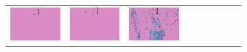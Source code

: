 \documentclass{ipol}
\begin{document}
\begin{figure}[ht]
\begin{subfigure}[t]{\linewidth}
\begin{tabular}{ccccccccc}
                \includegraphics[width=\s]{images/carnival/AHD/iso_64_grids.png}&
                \includegraphics[width=\s]{images/carnival/DCB/iso_64_grids.png}&
                \includegraphics[width=\s]{images/carnival/DHT/iso_64_grids.png}&

\end{tabular}
\end{subfigure}
\end{figure}
\end{document}
